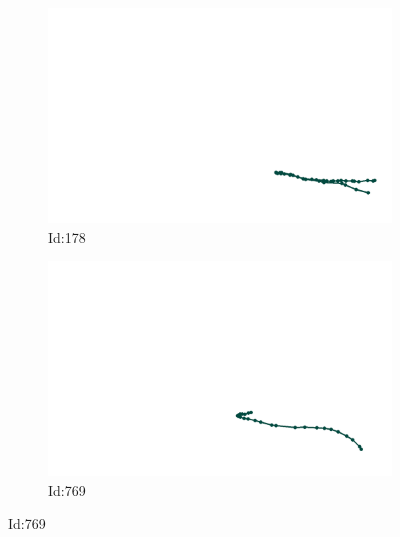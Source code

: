 \documentclass[12pt,twoside]{report}
\begin{document}
\begin{figure}
\centering
\begin{subfigure}[b]{0.20\textwidth}
\centering
\includegraphics[width=\textwidth]{../../trajectories/178.png}
\caption{Id:178}
\end{subfigure}
\begin{subfigure}[b]{0.20\textwidth}
\centering
\includegraphics[width=\textwidth]{../../trajectories/769.png}
\caption{Id:769}
\end{subfigure}
\end{figure}
\end{document}
